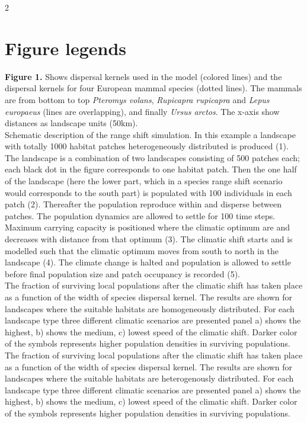 \documentclass[12pt,pdftex]{article}
\begin{document}
\begin{spacing}{2}
\clearpage

\section*{Figure legends}

{\bf Figure 1.} Shows dispersal kernels used in the model (colored lines) and the dispersal kernels for four European mammal species (dotted lines). The mammals are from bottom to top {\em Pteromys volans}, {\em Rupicapra rupicapra} and {\em Lepus europaeus} (lines are overlapping), and finally {\em Ursus arctos}. The x-axis show distances as landscape units (50km). \\

 Schematic description of the range shift simulation. In this example a landscape with totally 1000 habitat patches heterogeneously distributed is produced (1). The landscape is a combination of two landscapes consisting of 500 patches each;  each black dot in the figure corresponds to one habitat patch. Then the one half of the landscape (here the lower part, which in a species range shift scenario would corresponds to the south part) is populated with 100 individuals in each patch (2). Thereafter the population reproduce within and disperse between patches. The population dynamics are allowed to settle for 100 time steps. Maximum carrying capacity is positioned where the climatic optimum are and decreases with distance from that optimum (3). The climatic shift starts and is modelled such that the climatic optimum moves from south to north in the landscape (4). The climate change is halted and population is allowed to settle before final population size and patch occupancy is recorded (5).\\


 The fraction of surviving local populations after the climatic shift has taken place as a function of the width of species dispersal kernel. The results are shown for landscapes where the suitable habitats are homogeneously distributed. For each landscape type three different climatic scenarios are presented panel a) shows the highest, b)  shows the medium, c) lowest speed of the climatic shift. Darker color of the symbols represents higher population densities in surviving populations.\\

 The fraction of surviving local populations after the climatic shift has taken place as a function of the width of species dispersal kernel. The results are shown for landscapes where the suitable habitats are heterogenously distributed. For each landscape type three different climatic scenarios are presented panel a) shows the highest, b)  shows the medium, c) lowest speed of the climatic shift. Darker color of the symbols represents higher population densities in surviving populations.\\


\end{spacing}
\end{document}
